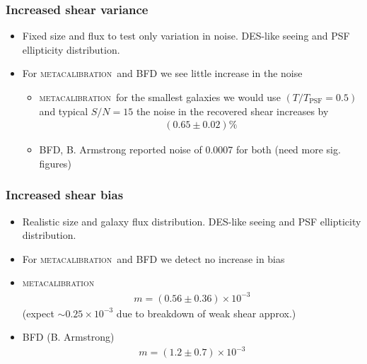 \documentclass{beamer}
\newcommand{\mcal}{\textsc{metacalibration}}
\begin{document}
\frame
{
    \frametitle{Increased shear variance}

 
    \begin{itemize}

        \item Fixed size and flux to test only variation in noise.  DES-like
            seeing and PSF ellipticity distribution.

        \item For \mcal\ and BFD we see little increase in the noise
            \begin{itemize}

                \item \mcal\ for the smallest galaxies we would use $(T/T_{\textrm{PSF}} = 0.5)$ and typical $S/N = 15$
                    the noise in the recovered shear increases by 
                    \begin{align}
                    (0.65 \pm 0.02) \%
                    \end{align}

                \item BFD, B. Armstrong reported noise of 0.0007 for both (need more sig. figures)

            \end{itemize}

    \end{itemize}

}

\frame
{
    \frametitle{Increased shear bias}

 
    \begin{itemize}

        \item Realistic size and galaxy flux distribution.  DES-like seeing and
            PSF ellipticity distribution.


        \item For \mcal\ and BFD we detect no increase in bias
        \item \mcal 
            \begin{align}
            m = (0.56 \pm 0.36) \times 10^{-3}
            \end{align}
            (expect $\sim 0.25 \times 10^{-3}$ due to breakdown of weak shear approx.)

        \item BFD (B. Armstrong)
            \begin{align}
                m = (1.2 \pm 0.7) \times 10^{-3}
            \end{align}



    \end{itemize}

}
\end{document}
